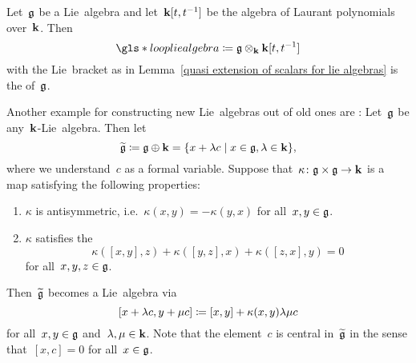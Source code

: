\begin{definition}
  Let~$\mathfrak{g}$ be a Lie~algebra and let~$\mathbf{k}[t, t^{-1}]$ be the algebra of Laurant polynomials over~$\kf$.
  Then
  \[
    \gls*{loop lie algebra}
    \defined
    \glie \tensor_\kf \kf[t, t^{-1}]
  \]
  with the Lie~bracket as in Lemma~\ref{quasi extension of scalars for lie algebras} is the  of~$\mathfrak{g}$.
\end{definition}
 
 
\begin{example}
  Another example for constructing new Lie~algebras out of old ones are :
  Let~$\mathfrak{g}$ be any~$\kf$-Lie~algebra.
  Then let
  \[
    \widetilde{\glie}
    \defined
    \glie \oplus \kf
    =
    \{
      x + \lambda c
    \suchthat
      x \in \glie,
      \lambda \in \kf
    \},
  \]
  where we understand~$c$ as a formal variable.
  Suppose that~$\kappa \colon \mathfrak{g} \times \mathfrak{g} \to \mathbf{k}$ is a~{\bilinear{$\kf$}} map satisfying the following properties:
  \begin{enumerate}
  \item
    $\kappa$ is antisymmetric, i.e.~$\kappa(x,y) = -\kappa(y,x)$ for all~$x,y \in \mathfrak{g}$.
  \item
    $\kappa$ satisfies the 
    \[
      \kappa([x,y],z) + \kappa([y,z],x) + \kappa([z,x],y) = 0
    \]
    for all~$x, y, z \in \mathfrak{g}$.
  \end{enumerate}
  Then~$\widetilde{\mathfrak{g}}$ becomes a Lie~algebra via
  \[
    [x + \lambda c, y + \mu c]
    \coloneqq
    [x,y] + \kappa(x,y) \lambda \mu c
  \]
  for all~$x, y \in \mathfrak{g}$ and~$\lambda, \mu \in \mathbf{k}$.
  Note that the element~$c$ is central in~$\widetilde{\mathfrak{g}}$ in the sense that~$[x,c] = 0$ for all~$x \in \mathfrak{g}$.
  

\end{example}
